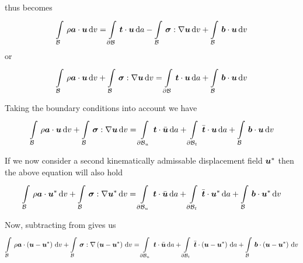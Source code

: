  thus becomes
\begin{equation}
  \gint{\embedmanifold{B}}{}{\dotprod{\rho\vectr{a}}{\vectr{u}}}{v}=
  \gint{\boundary{\embedmanifold{B}}}{}{\dotprod{\vectr{t}}{\vectr{u}}}{a}-
  \gint{\embedmanifold{B}}{}{\doubledotprod{\tensor{\sigma}}{\gradient{}{\vectr{u}}}}{v}+
  \gint{\embedmanifold{B}}{}{\dotprod{\vectr{b}}{\vectr{u}}}{v}
\end{equation}
or
\begin{equation}
  \gint{\embedmanifold{B}}{}{\dotprod{\rho\vectr{a}}{\vectr{u}}}{v}+
  \gint{\embedmanifold{B}}{}{\doubledotprod{\tensor{\sigma}}{\gradient{}{\vectr{u}}}}{v}=
  \gint{\boundary{\embedmanifold{B}}}{}{\dotprod{\vectr{t}}{\vectr{u}}}{a}+
  \gint{\embedmanifold{B}}{}{\dotprod{\vectr{b}}{\vectr{u}}}{v}
\end{equation}

Taking the boundary conditions into account we have
\begin{equation}
  \gint{\embedmanifold{B}}{}{\dotprod{\rho\vectr{a}}{\vectr{u}}}{v}+
  \gint{\embedmanifold{B}}{}{\doubledotprod{\tensor{\sigma}}{\gradient{}{\vectr{u}}}}{v}=
  \gint{\boundary{\embedmanifold{B}}_{u}}{}{\dotprod{\vectr{t}}{\bar{\vectr{u}}}}{a}+
  \gint{\boundary{\embedmanifold{B}}_{t}}{}{\dotprod{\bar{\vectr{t}}}{\vectr{u}}}{a}+
  \gint{\embedmanifold{B}}{}{\dotprod{\vectr{b}}{\vectr{u}}}{v}
  \label{eqn:virtualworkdisp1}
\end{equation}

If we now consider a second kinematically admissable displacement field
$ \boldsymbol{u} ^{*}$ then the above equation will also hold \ie
\begin{equation}
  \gint{\embedmanifold{B}}{}{\dotprod{\rho\vectr{a}}{\vectr{u}^{*}}}{v}+
  \gint{\embedmanifold{B}}{}{\doubledotprod{\tensor{\sigma}}{\gradient{}{\vectr{u}^{*}}}}{v}=
  \gint{\boundary{\embedmanifold{B}}_{u}}{}{\dotprod{\vectr{t}}{\bar{\vectr{u}}}}{a}+
  \gint{\boundary{\embedmanifold{B}}_{t}}{}{\dotprod{\bar{\vectr{t}}}{\vectr{u}^{*}}}{a}+
  \gint{\embedmanifold{B}}{}{\dotprod{\vectr{b}}{\vectr{u}^{*}}}{v}
  \label{eqn:virtualworkdisp2}
\end{equation}

Now, subtracting  from
 gives us
\begin{equation}
  \gint{\embedmanifold{B}}{}{\dotprod{\rho\vectr{a}}{\pbrac{\vectr{u}-\vectr{u}^{*}}}}{v}+
  \gint{\embedmanifold{B}}{}{\doubledotprod{\tensor{\sigma}}{\gradient{}{\pbrac{\vectr{u}-\vectr{u}^{*}}}}}{v}=
  \gint{\boundary{\embedmanifold{B}}_{u}}{}{\dotprod{\vectr{t}}{\bar{\vectr{u}}}}{a}+
  \gint{\boundary{\embedmanifold{B}}_{t}}{}{\dotprod{\bar{\vectr{t}}}{\pbrac{\vectr{u}-\vectr{u}^{*}}}}{a}+
  \gint{\embedmanifold{B}}{}{\dotprod{\vectr{b}}{\pbrac{\vectr{u}-\vectr{u}^{*}}}}{v}
  \label{eqn:virtualworkdispdiff}
\end{equation}


